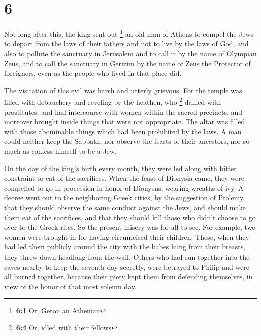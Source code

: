 \hypertarget{section-5}{%
\section{6}\label{section-5}}

 Not long after this, the king sent out \footnote{\textbf{6:1}
  Or, Geron an Athenian} an old man of Athens to compel the Jews to
depart from the laws of their fathers and not to live by the laws of
God,  and also to pollute the sanctuary in Jerusalem and
to call it by the name of Olympian Zeus, and to call the sanctuary in
Gerizim by the name of Zeus the Protector of foreigners, even as the
people who lived in that place did.

 The visitation of this evil was harsh and utterly
grievous.  For the temple was filled with debauchery and
reveling by the heathen, who \footnote{\textbf{6:4} Or, idled with their
  fellows} dallied with prostitutes, and had intercourse with women
within the sacred precincts, and moreover brought inside things that
were not appropriate.  The altar was filled with those
abominable things which had been prohibited by the laws. 
A man could neither keep the Sabbath, nor observe the feasts of their
ancestors, nor so much as confess himself to be a Jew.

 On the day of the king's birth every month, they were led
along with bitter constraint to eat of the sacrifices. When the feast of
Dionysia came, they were compelled to go in procession in honor of
Dionysus, wearing wreaths of ivy.  A decree went out to
the neighboring Greek cities, by the suggestion of Ptolemy, that they
should observe the same conduct against the Jews, and should make them
eat of the sacrifices,  and that they should kill those
who didn't choose to go over to the Greek rites. So the present misery
was for all to see.  For example, two women were brought
in for having circumcised their children. These, when they had led them
publicly around the city with the babes hung from their breasts, they
threw down headlong from the wall.  Others who had run
together into the caves nearby to keep the seventh day secretly, were
betrayed to Philip and were all burned together, because their piety
kept them from defending themselves, in view of the honor of that most
solemn day.


